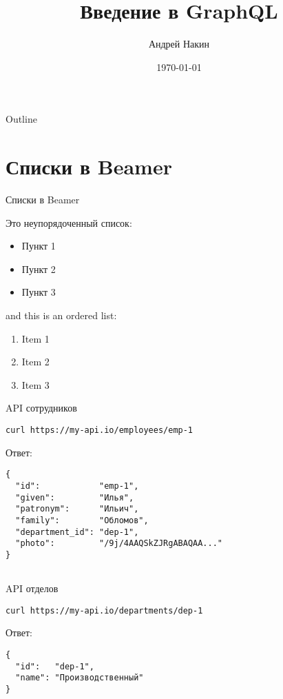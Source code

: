 \documentclass{beamer}
\title{Введение в GraphQL}
\author{Андрей Накин}
\date{\today}
\begin{document}
\begin{frame}
    \titlepage 
\end{frame}



\begin{frame}{Outline}
    \tableofcontents
\end{frame}


\section{Списки в Beamer}
\begin{frame}{Списки в Beamer}

Это неупорядоченный список:
\begin{itemize}
    \item Пункт 1
    \item Пункт 2
    \item Пункт 3
\end{itemize}

and this is an ordered list:
\begin{enumerate}
    \item Item 1
    \item Item 2
    \item Item 3
\end{enumerate}

\end{frame}


\begin{frame}[fragile]{API сотрудников}
\begin{verbatim}
curl https://my-api.io/employees/emp-1
\end{verbatim}

Ответ:

\begin{verbatim}
{
  "id":            "emp-1",
  "given":         "Илья",
  "patronym":      "Ильич",
  "family":        "Обломов",
  "department_id": "dep-1",
  "photo":         "/9j/4AAQSkZJRgABAQAA..."
}
 
\end{verbatim}

\end{frame}

\begin{frame}[fragile]{API отделов}
\begin{verbatim}
curl https://my-api.io/departments/dep-1
\end{verbatim}

Ответ:

\begin{verbatim}
{
  "id":   "dep-1",
  "name": "Производственный"
}
\end{verbatim}

\end{frame}
\end{document}
